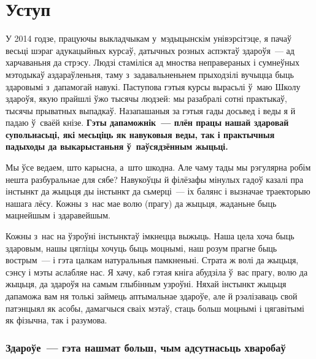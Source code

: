 \chapter*{Уступ}

У 2014 годзе, працуючы выкладчыкам у~мэдыцынскім унівэрсітэце, я пачаў весьці шэраг адукацыйных курсаў, датычных розных аспэктаў здароўя~--- ад харчаваньня да стрэсу. Людзі стаміліся ад мноства неправераных і сумнеўных мэтодыкаў аздараўленьня, таму з~задавальненьнем прыходзілі вучыцца быць здаровымі з~дапамогай навукі. Паступова гэтыя курсы вырасьлі ў~маю Школу здароўя, якую прайшлі ўжо тысячы людзей: мы разабралі сотні практыкаў, тысячы прыватных выпадкаў. Назапашаныя за гэтыя гады досьвед і веды я й падаю ў~сваёй кнізе. \textbf{Гэты дапаможнік~--- плён працы нашай здаровай супольнасьці, які месьціць як навуковыя веды, так і практычныя падыходы да выкарыстаньня ў~паўсядзённым жыцьці.}

Мы ўсе ведаем, што карысна, а~што шкодна. Але чаму тады мы рэгулярна робім нешта разбуральнае для сябе? Навукоўцы й філёзафы мінулых гадоў казалі пра інстынкт да жыцьця ды інстынкт да сьмерці~--- іх балянс і вызначае траекторыю нашага лёсу. Кожны з~нас мае волю (прагу) да жыцьця, жаданьне быць мацнейшым і здаравейшым.


Кожны з~нас на ўзроўні інстынктаў імкнецца выжыць. Наша цела хоча быць здаровым, нашы цягліцы хочуць быць моцнымі, наш розум прагне быць вострым~--- і гэта цалкам натуральныя памкненьні. Страта ж волі да жыцьця, сэнсу і мэты аслабляе нас. Я хачу, каб гэтая кніга абудзіла ў~вас прагу, волю да жыцьця, да здароўя на самым глыбінным узроўні. Няхай інстынкт жыцьця дапаможа вам ня толькі займець аптымальнае здароўе, але й рэалізаваць свой патэнцыял як асобы, дамагчыся сваіх мэтаў, стаць больш моцнымі і цягавітымі як фізычна, так і разумова.


\subsection{Здароўе~--- гэта нашмат больш, чым адсутнасьць хваробаў}

